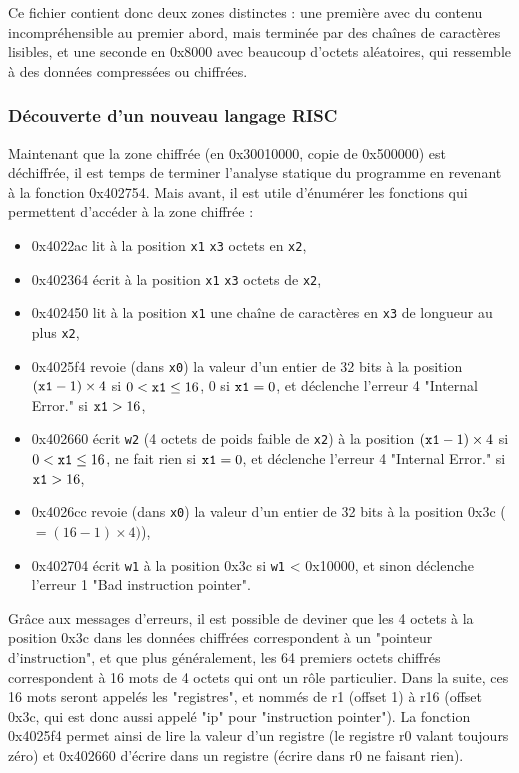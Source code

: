 \documentclass[a4paper,10pt]{article}
\begin{document}
Ce fichier contient donc deux zones distinctes : une première avec du contenu incompréhensible au premier abord, mais terminée par des chaînes de caractères lisibles, et une seconde en 0x8000 avec beaucoup d'octets aléatoires, qui ressemble à des données compressées ou chiffrées.

\subsubsection{Découverte d'un nouveau langage RISC}
\label{arm64risc}

Maintenant que la zone chiffrée (en 0x30010000, copie de 0x500000) est déchiffrée, il est temps de terminer l'analyse statique du programme en revenant à la fonction 0x402754. Mais avant, il est utile d'énumérer les fonctions qui permettent d'accéder à la zone chiffrée :
\begin{itemize}
\item 0x4022ac lit à la position \texttt{x1} \texttt{x3} octets en \texttt{x2},
\item 0x402364 écrit à la position \texttt{x1} \texttt{x3} octets de \texttt{x2},
\item 0x402450 lit à la position \texttt{x1} une chaîne de caractères en \texttt{x3} de longueur au plus \texttt{x2},
\item 0x4025f4 revoie (dans \texttt{x0}) la valeur d'un entier de 32 bits à la position $(\mbox{\texttt{x1}} - 1) \times 4$ si $0 < \mbox{\texttt{x1}} \le 16$, 0 si $\mbox{\texttt{x1}} = 0$, et déclenche l'erreur 4 "Internal Error." si $\mbox{\texttt{x1}} > 16$,
\item 0x402660 écrit \texttt{w2} (4 octets de poids faible de \texttt{x2}) à la position $(\mbox{\texttt{x1}} - 1) \times 4$ si $0 < \mbox{\texttt{x1}} \le 16$, ne fait rien si $\mbox{\texttt{x1}} = 0$, et déclenche l'erreur 4 "Internal Error." si $\mbox{\texttt{x1}} > 16$,
\item 0x4026cc revoie (dans \texttt{x0}) la valeur d'un entier de 32 bits à la position 0x3c ($ = (16 - 1) \times 4)$),
\item 0x402704 écrit \texttt{w1} à la position 0x3c si \texttt{w1} < 0x10000, et sinon déclenche l'erreur 1 "Bad instruction pointer".
\end{itemize}

Grâce aux messages d'erreurs, il est possible de deviner que les 4 octets à la position 0x3c dans les données chiffrées correspondent à un "pointeur d'instruction", et que plus généralement, les 64 premiers octets chiffrés correspondent à 16 mots de 4 octets qui ont un rôle particulier. Dans la suite, ces 16 mots seront appelés les "registres", et nommés de r1 (offset 1) à r16 (offset 0x3c, qui est donc aussi appelé "ip" pour "instruction pointer"). La fonction 0x4025f4 permet ainsi de lire la valeur d'un registre (le registre r0 valant toujours zéro) et 0x402660 d'écrire dans un registre (écrire dans r0 ne faisant rien).
\end{document}
